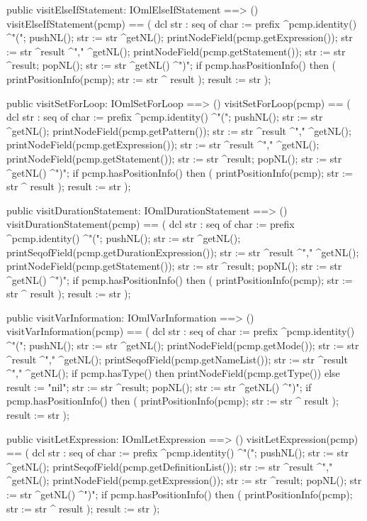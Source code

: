 \begin{vdm_al}
  public visitElseIfStatement: IOmlElseIfStatement ==> ()
  visitElseIfStatement(pcmp) ==
    ( dcl str : seq of char := prefix ^pcmp.identity() ^"(";
      pushNL();
      str := str ^getNL();
      printNodeField(pcmp.getExpression());
      str := str ^result ^"," ^getNL();
      printNodeField(pcmp.getStatement());
      str := str ^result;
      popNL();
      str := str ^getNL() ^")";
      if pcmp.hasPositionInfo()
      then ( printPositionInfo(pcmp);
             str := str ^ result );
      result := str );

  public visitSetForLoop: IOmlSetForLoop ==> ()
  visitSetForLoop(pcmp) ==
    ( dcl str : seq of char := prefix ^pcmp.identity() ^"(";
      pushNL();
      str := str ^getNL();
      printNodeField(pcmp.getPattern());
      str := str ^result ^"," ^getNL();
      printNodeField(pcmp.getExpression());
      str := str ^result ^"," ^getNL();
      printNodeField(pcmp.getStatement());
      str := str ^result;
      popNL();
      str := str ^getNL() ^")";
      if pcmp.hasPositionInfo()
      then ( printPositionInfo(pcmp);
             str := str ^ result );
      result := str );

  public visitDurationStatement: IOmlDurationStatement ==> ()
  visitDurationStatement(pcmp) ==
    ( dcl str : seq of char := prefix ^pcmp.identity() ^"(";
      pushNL();
      str := str ^getNL();
      printSeqofField(pcmp.getDurationExpression());
      str := str ^result ^"," ^getNL();
      printNodeField(pcmp.getStatement());
      str := str ^result;
      popNL();
      str := str ^getNL() ^")";
      if pcmp.hasPositionInfo()
      then ( printPositionInfo(pcmp);
             str := str ^ result );
      result := str );

  public visitVarInformation: IOmlVarInformation ==> ()
  visitVarInformation(pcmp) ==
    ( dcl str : seq of char := prefix ^pcmp.identity() ^"(";
      pushNL();
      str := str ^getNL();
      printNodeField(pcmp.getMode());
      str := str ^result ^"," ^getNL();
      printSeqofField(pcmp.getNameList());
      str := str ^result ^"," ^getNL();
      if pcmp.hasType()
      then printNodeField(pcmp.getType())
      else result := "nil";
      str := str ^result;
      popNL();
      str := str ^getNL() ^")";
      if pcmp.hasPositionInfo()
      then ( printPositionInfo(pcmp);
             str := str ^ result );
      result := str );

  public visitLetExpression: IOmlLetExpression ==> ()
  visitLetExpression(pcmp) ==
    ( dcl str : seq of char := prefix ^pcmp.identity() ^"(";
      pushNL();
      str := str ^getNL();
      printSeqofField(pcmp.getDefinitionList());
      str := str ^result ^"," ^getNL();
      printNodeField(pcmp.getExpression());
      str := str ^result;
      popNL();
      str := str ^getNL() ^")";
      if pcmp.hasPositionInfo()
      then ( printPositionInfo(pcmp);
             str := str ^ result );
      result := str );


\end{vdm_al}
